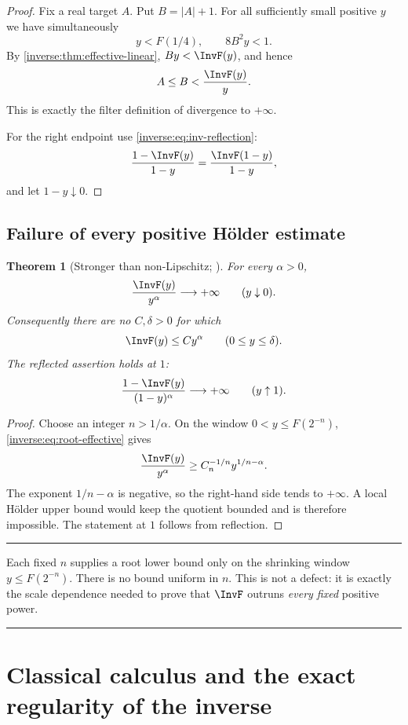 \documentclass[11pt,oneside]{article}
\newtheorem{theorem}{Theorem}[section]
\theoremstyle{definition}
\theoremstyle{remark}
\newenvironment{boxedremark}{%
  \par\smallskip\noindent\begin{center}\begin{minipage}{0.94\textwidth}%
  \color{black}\hrule\vspace{0.6em}\small
}{%
  \vspace{0.6em}\hrule\end{minipage}\end{center}\smallskip
}
\begin{document}
\begin{proof}
Fix a real target $A$.  Put $B=|A|+1$.  For all sufficiently small
positive $y$ we have simultaneously
\[
 y<F(1/4),\qquad 8B^2y<1.
\]
By \cref{inverse:thm:effective-linear}, $By<\InvF(y)$, and hence
\[
 A\leq B<\frac{\InvF(y)}y.
\]
This is exactly the filter definition of divergence to $+\infty$.

For the right endpoint use \eqref{inverse:eq:inv-reflection}:
\[
 \frac{1-\InvF(y)}{1-y}
 =\frac{\InvF(1-y)}{1-y},
\]
and let $1-y\downarrow0$.
\end{proof}

\subsection{Failure of every positive Hölder estimate}

\begin{theorem}[Stronger than non-Lipschitz; \Derived]
\label{inverse:thm:no-holder}
For every $\alpha>0$,
\[
 \frac{\InvF(y)}{y^\alpha}\longrightarrow+\infty
 \qquad (y\downarrow0).
\]
Consequently there are no $C,\delta>0$ for which
\[
 \InvF(y)\leq Cy^\alpha\qquad(0\leq y\leq\delta).
\]
The reflected assertion holds at $1$:
\[
 \frac{1-\InvF(y)}{(1-y)^\alpha}\longrightarrow+\infty
 \qquad (y\uparrow1).
\]
\end{theorem}

\begin{proof}
Choose an integer $n>1/\alpha$.  On the window
$0<y\leq F(2^{-n})$, \cref{inverse:eq:root-effective} gives
\[
 \frac{\InvF(y)}{y^\alpha}
 \geq C_n^{-1/n}y^{1/n-\alpha}.
\]
The exponent $1/n-\alpha$ is negative, so the right-hand side tends to
$+\infty$.  A local Hölder upper bound would keep the quotient bounded and
is therefore impossible.  The statement at $1$ follows from reflection.
\end{proof}

\begin{boxedremark}
Each fixed $n$ supplies a root lower bound only on the shrinking window
$y\leq F(2^{-n})$.  There is no bound uniform in $n$.  This is not a
defect: it is exactly the scale dependence needed to prove that
$\InvF$ outruns \emph{every fixed} positive power.
\end{boxedremark}


\section{Classical calculus and the exact regularity of the inverse}
\label{inverse:sec:inverse-calculus}
\end{document}

